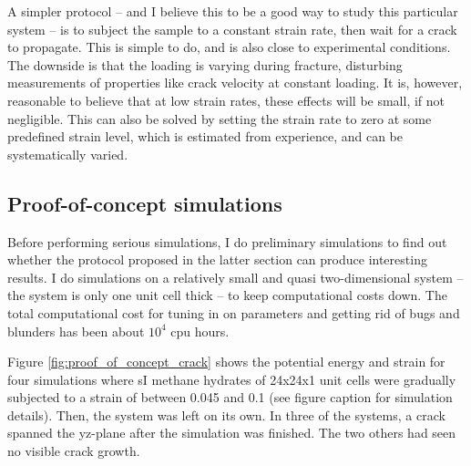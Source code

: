 A simpler protocol -- and I believe this to be a good way to study this particular system -- is to subject the sample to a constant strain rate, then wait for a crack to propagate. This is simple to do, and is also close to experimental conditions. The downside is that the loading is varying during fracture, disturbing measurements of properties like crack velocity at constant loading. It is, however, reasonable to believe that at low strain rates, these effects will be small, if not negligible. This can also be solved by setting the strain rate to zero at some predefined strain level, which is estimated from experience, and can be systematically varied. 


\subsection{Proof-of-concept simulations}
Before performing serious simulations, I do preliminary simulations to find out whether the protocol proposed in the latter section can produce interesting results. I do simulations on a relatively small and quasi two-dimensional system -- the system is only one unit cell thick -- to keep computational costs down. The total computational cost for tuning in on parameters and getting rid of bugs and blunders has been about $10^4$ cpu hours.

Figure \ref{fig:proof_of_concept_crack} shows the potential energy and strain for four simulations where sI methane hydrates of 24x24x1 unit cells were gradually subjected to a strain of between 0.045 and 0.1 (see figure caption for simulation details). Then, the system was left on its own. In three of the systems, a crack spanned the yz-plane after the simulation was finished. The two others had seen no visible crack growth.

